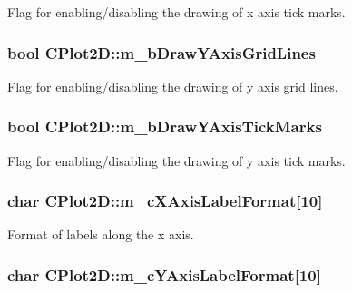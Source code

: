 Flag for enabling/disabling the drawing of x axis tick marks. \hypertarget{class_c_plot2_d_aa54323d6a592be700acd7e3dc0ec32af}{
\subsubsection[{m\-\_\-b\-Draw\-Y\-Axis\-Grid\-Lines}]{\setlength{\rightskip}{0pt plus 5cm}bool C\-Plot2\-D\-::m\-\_\-b\-Draw\-Y\-Axis\-Grid\-Lines\hspace{0.3cm}{\ttfamily [protected]}}}\label{class_c_plot2_d_aa54323d6a592be700acd7e3dc0ec32af}
Flag for enabling/disabling the drawing of y axis grid lines. \hypertarget{class_c_plot2_d_a0d4fbd6a642fa301e1b22302c334d09c}{
\subsubsection[{m\-\_\-b\-Draw\-Y\-Axis\-Tick\-Marks}]{\setlength{\rightskip}{0pt plus 5cm}bool C\-Plot2\-D\-::m\-\_\-b\-Draw\-Y\-Axis\-Tick\-Marks\hspace{0.3cm}{\ttfamily [protected]}}}\label{class_c_plot2_d_a0d4fbd6a642fa301e1b22302c334d09c}
Flag for enabling/disabling the drawing of y axis tick marks. \hypertarget{class_c_plot2_d_ad3c1c668b0535a344006b9510037ae7e}{
\subsubsection[{m\-\_\-c\-X\-Axis\-Label\-Format}]{\setlength{\rightskip}{0pt plus 5cm}char C\-Plot2\-D\-::m\-\_\-c\-X\-Axis\-Label\-Format\mbox{[}10\mbox{]}\hspace{0.3cm}{\ttfamily [protected]}}}\label{class_c_plot2_d_ad3c1c668b0535a344006b9510037ae7e}
Format of labels along the x axis. \hypertarget{class_c_plot2_d_acce78a82ddf2f28b79a778bfa30e02dd}{
\subsubsection[{m\-\_\-c\-Y\-Axis\-Label\-Format}]{\setlength{\rightskip}{0pt plus 5cm}char C\-Plot2\-D\-::m\-\_\-c\-Y\-Axis\-Label\-Format\mbox{[}10\mbox{]}\hspace{0.3cm}{\ttfamily [protected]}}}\label{class_c_plot2_d_acce78a82ddf2f28b79a778bfa30e02dd}
